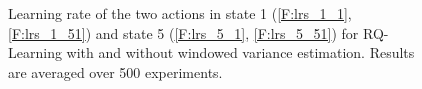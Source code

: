 \documentclass[conference]{IEEEtran}
\begin{document}
\begin{figure}[t]
\begin{minipage}{\textwidth}
\end{minipage}
\caption{Learning rate of the two actions in state 1 (\ref{F:lrs_1_1}, \ref{F:lrs_1_51}) and state 5 (\ref{F:lrs_5_1}, \ref{F:lrs_5_51}) for RQ-Learning with and without windowed variance estimation. Results are averaged over 500 experiments.}
  \label{F:double_chain_lr}
\end{figure}
\end{document}
